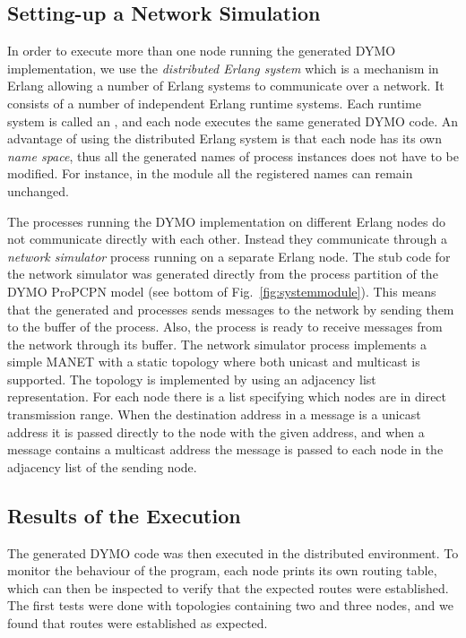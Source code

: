 \subsection{Setting-up a Network Simulation}
In order to execute more than one node running the generated DYMO implementation, we use the \emph{distributed Erlang system} which is a mechanism in Erlang allowing a number of Erlang systems to communicate over a network. It consists of a number of independent Erlang runtime systems. Each runtime system is called an , and each node executes the same generated DYMO code. An advantage of using the distributed Erlang system is that each node has its own \emph{name space}, thus all the generated names of process instances does not have to be modified. For instance, in the  module all the registered names can remain unchanged.

The processes running the DYMO implementation on different Erlang nodes do not communicate directly with each other. Instead they communicate through a \emph{network simulator} process running on a separate Erlang node. The stub code for the network simulator was generated directly from the  process partition of the DYMO ProPCPN model (see bottom of Fig.~\ref{fig:systemmodule}). This means that the generated  and  processes sends messages to the network by sending them to the buffer of the  process. Also, the  process is ready to receive messages from the network through its buffer. The network simulator process implements a simple MANET with a static topology where both unicast and multicast is supported. The topology is implemented by using an adjacency list representation. For each node there is a list specifying which nodes are in direct transmission range. When the destination address in a message is a unicast address it is passed directly to the node with the given address, and when a message contains a multicast address the message is passed to each node in the adjacency list of the sending node.

\subsection{Results of the Execution}
The generated DYMO code was then executed in the distributed environment. To monitor the behaviour of the program, each node prints its own routing table, which can then be inspected to verify that the expected routes were established. The first tests were done with topologies containing two and three nodes, and we found that routes were established as expected.

